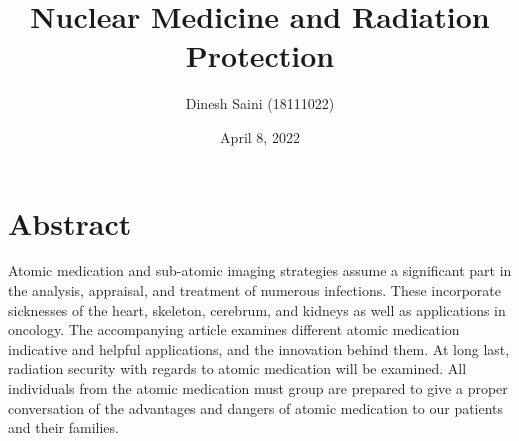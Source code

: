 \documentclass[12pt]{article}
\begin{document}
\title{Nuclear Medicine and Radiation Protection}
\author{Dinesh Saini (18111022)}
\date{April 8, 2022}
\maketitle

\section{Abstract}

Atomic medication and sub-atomic imaging strategies assume a significant part in the analysis, appraisal, and treatment of numerous infections. These incorporate sicknesses of the heart, skeleton, cerebrum, and kidneys as well as applications in oncology. The accompanying article examines different atomic medication indicative and helpful applications, and the innovation behind them. At long last, radiation security with regards to atomic medication will be examined. All individuals from the atomic medication must group are prepared to give a proper conversation of the advantages and dangers of atomic medication to our patients and their families.
\end{document}
